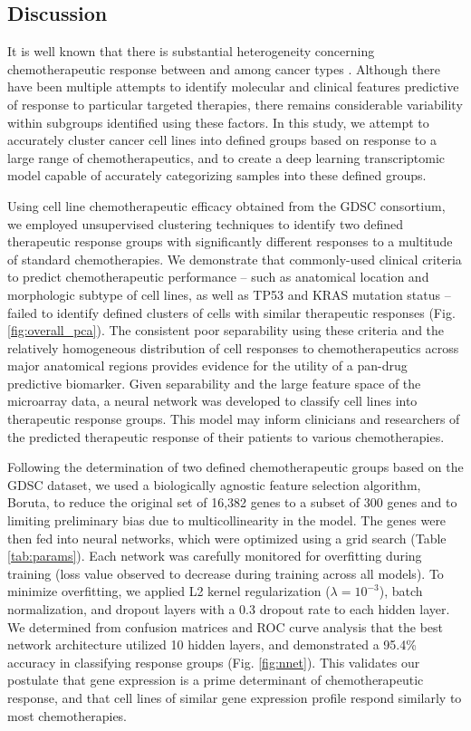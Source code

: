\documentclass[10pt, letterpaper]{article}
\begin{document}
\begin{multicols*}{2}
\section{Discussion}
It is well known that there is substantial heterogeneity concerning chemotherapeutic response between and among cancer types \cite{hetero, plasticity}. Although there have been multiple attempts to identify molecular and clinical features predictive of response to particular targeted therapies, there remains considerable variability within subgroups identified using these factors. In this study, we attempt to accurately cluster cancer cell lines into defined groups based on response to a large range of chemotherapeutics, and to create a deep learning transcriptomic model capable of accurately categorizing samples into these defined groups.

Using cell line chemotherapeutic efficacy obtained from the GDSC consortium, we employed unsupervised clustering techniques to identify two defined therapeutic response groups with significantly different responses to a multitude of standard chemotherapies. We demonstrate that commonly-used clinical criteria to predict chemotherapeutic performance -- such as anatomical location and morphologic subtype of cell lines, as well as TP53 and KRAS mutation status -- failed to identify defined clusters of cells with similar therapeutic responses (Fig. \ref{fig:overall_pca}). The consistent poor separability using these criteria and the relatively homogeneous distribution of cell responses to chemotherapeutics across major anatomical regions provides evidence for the utility of a pan-drug predictive biomarker. Given separability and the large feature space of the microarray data, a neural network was developed to classify cell lines into therapeutic response groups. This model may inform clinicians and researchers of the predicted therapeutic response of their patients to various chemotherapies.

Following the determination of two defined chemotherapeutic groups based on the GDSC dataset, we used a biologically agnostic feature selection algorithm, Boruta, to reduce the original set of 16,382 genes to a subset of 300 genes and to limiting preliminary bias due to multicollinearity in the model. The genes were then fed into neural networks, which were optimized using a grid search (Table \ref{tab:params}). Each network was carefully monitored for overfitting during training (loss value observed to decrease during training across all models). To minimize overfitting, we applied L2 kernel regularization ($\lambda=10^{-3}$), batch normalization, and dropout layers with a 0.3 dropout rate to each hidden layer. We determined from confusion matrices and ROC curve analysis that the best network architecture utilized 10 hidden layers, and demonstrated a 95.4\% accuracy in classifying response groups (Fig. \ref{fig:nnet}). This validates our postulate that gene expression is a prime determinant of chemotherapeutic response, and that cell lines of similar gene expression profile respond similarly to most chemotherapies.


\end{multicols*}
\end{document}

